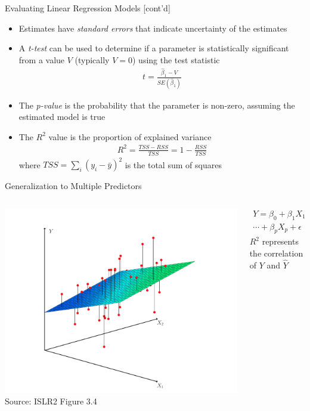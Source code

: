 \documentclass[ignorenonframetext,xcolor=x11names]{beamer}
\begin{document}
\begin{frame}{Evaluating Linear Regression Models \small [cont'd]}
\begin{itemize}
  \item Estimates have \emph{standard errors} that indicate uncertainty of the estimates
  \item A \emph{t-test} can be used to determine if a parameter is statistically significant from a value $V$ (typically $V=0$) using the test statistic
\begin{align*}
t = \frac{\hat{\beta}_1 - V}{SE(\hat{\beta}_1)}
\end{align*}
  \item The \emph{p-value} is the probability that the parameter is non-zero, assuming the estimated model is true
  \item The $R^2$ value is the proportion of explained variance
\begin{align*}
R^2 = \frac{TSS - RSS}{TSS} = 1 - \frac{RSS}{TSS}
\end{align*}
where $TSS = \sum_i(y_i - \bar{y})^2$ is the total sum of squares
\end{itemize}
\end{frame}

\begin{frame}{Generalization to Multiple Predictors}
\begin{columns}
\begin{column}{0.65\textwidth}
\includegraphics[width=\textwidth]{../class11/Figures_Chapters_1-6/Chapter3/3_4.pdf}  \\
\scriptsize Source: ISLR2 Figure 3.4
\end{column}
\begin{column}{0.35\textwidth}
\begin{multline*}
Y = \beta_0 + \beta_1 X_1 + \beta_2 X_2 + \\
\cdots + \beta_p X_p + \epsilon
\end{multline*}
$R^2$ represents the correlation of $Y$ and $\hat{Y}$
\end{column}
\end{columns}
\end{frame}
\end{document}
